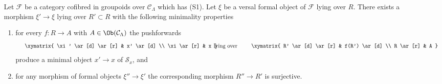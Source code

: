 \begin{lemma}
\label{lemma-smallest-where-descends-versal}
Let $\mathcal{F}$ be a category cofibred in groupoids over
$\mathcal{C}_\Lambda$ which has (S1). Let $\xi$ be a versal formal object
of $\mathcal{F}$ lying over $R$. There exists a morphism $\xi' \to \xi$
lying over $R' \subset R$ with the following minimality properties
\begin{enumerate}
\item for every $f : R \to A$ with $A \in \Ob(\mathcal{C}_\Lambda)$
the pushforwards
$$
\vcenter{
\xymatrix{
\xi' \ar[d] \ar[r] & x' \ar[d] \\
\xi \ar[r] & x
}
}
\quad\text{lying over}\quad
\vcenter{
\xymatrix{
R' \ar[d] \ar[r] & f(R') \ar[d] \\
R \ar[r] & A
}
}
$$
produce a minimal object $x' \to x$ of $\mathcal{S}_x$, and
\item for any morphism of formal objects $\xi'' \to \xi'$
the corresponding morphism $R'' \to R'$ is surjective.
\end{enumerate}
\end{lemma}

